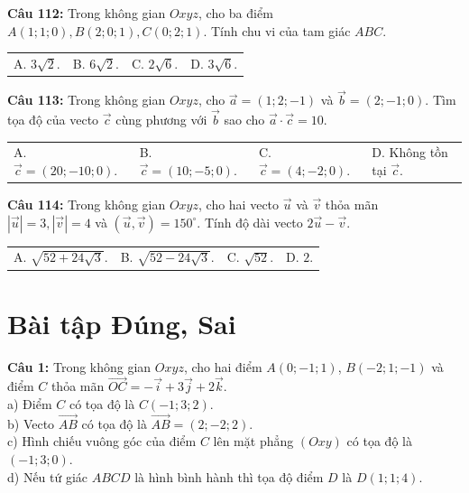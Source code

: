 \documentclass[12pt]{article}
\begin{document}
	\vspace{2mm}
	\noindent \textbf{Câu 112:} Trong không gian $Oxyz$, cho ba điểm $A(1; 1; 0), B(2; 0; 1), C(0; 2; 1)$. Tính chu vi của tam giác $ABC$. \\
	\noindent
	\begin{tabular}{p{} p{} p{} p{}}
		A. $3\sqrt{2}$. & B. $6\sqrt{2}$. & C. $2\sqrt{6}$. & D. $3\sqrt{6}$.
	\end{tabular}
	
	\vspace{2mm}
	\noindent \textbf{Câu 113:} Trong không gian $Oxyz$, cho $\vec{a} = (1; 2; -1)$ và $\vec{b} = (2; -1; 0)$. Tìm tọa độ của vecto $\vec{c}$ cùng phương với $\vec{b}$ sao cho $\vec{a} \cdot \vec{c} = 10$. \\
	\noindent
	\begin{tabular}{p{} p{} p{} p{}}
		A. $\vec{c} = (20; -10; 0)$. & B. $\vec{c} = (10; -5; 0)$. & C. $\vec{c} = (4; -2; 0)$. & D. Không tồn tại $\vec{c}$.
	\end{tabular}
	
	\vspace{2mm}
	\noindent \textbf{Câu 114:} Trong không gian $Oxyz$, cho hai vecto $\vec{u}$ và $\vec{v}$ thỏa mãn $|\vec{u}| = 3, |\vec{v}| = 4$ và $(\vec{u}, \vec{v}) = 150^\circ$. Tính độ dài vecto $2\vec{u} - \vec{v}$. \\
	\noindent
	\begin{tabular}{p{} p{} p{} p{}}
		A. $\sqrt{52 + 24\sqrt{3}}$. & B. $\sqrt{52 - 24\sqrt{3}}$. & C. $\sqrt{52}$. & D. $2$.
	\end{tabular}
	
	\section{Bài tập Đúng, Sai}
	\noindent \textbf{Câu 1:} Trong không gian $Oxyz$, cho hai điểm $A(0; -1; 1)$, $B(-2; 1; -1)$ và điểm $C$ thỏa mãn $\vec{OC} = -\vec{i} + 3\vec{j} + 2\vec{k}$. \\
	\noindent a) Điểm $C$ có tọa độ là $C(-1; 3; 2)$. \\
	\noindent b) Vecto $\vec{AB}$ có tọa độ là $\vec{AB} = (2; -2; 2)$. \\
	\noindent c) Hình chiếu vuông góc của điểm $C$ lên mặt phẳng $(Oxy)$ có tọa độ là $(-1; 3; 0)$. \\
	\noindent d) Nếu tứ giác $ABCD$ là hình bình hành thì tọa độ điểm $D$ là $D(1; 1; 4)$.
	
\end{document}

